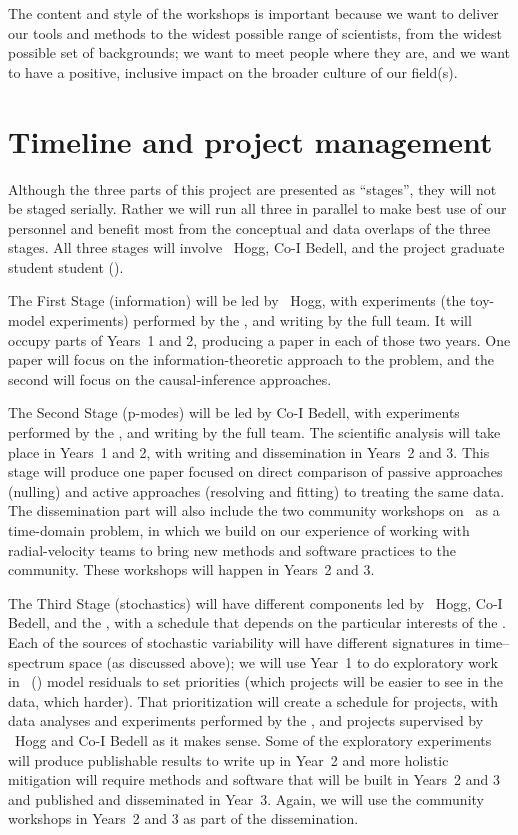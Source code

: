 \documentclass[12pt, letterpaper]{article}
\begin{document}
The content and style of the workshops is important because we want to deliver our tools and methods
to the widest possible range of scientists, from the widest possible set of
backgrounds; we want to meet people where they are, and we want
to have a positive, inclusive impact on the broader culture of our field(s).

\section{Timeline and project management}

Although the three parts of this project are presented as ``stages'',
they will not be staged serially.
Rather we will run all three in parallel to make best use of our
personnel and benefit most from the conceptual and data overlaps of the three stages.
All three stages will involve \PI\ Hogg, Co-I Bedell, and the project
graduate student student (\GRA). 

The First Stage (information) will be led by \PI\ Hogg, with experiments (the
toy-model experiments) performed by the \GRA, and writing by the full
team.
It will occupy parts of Years~1 and 2, producing a paper
in each of those two years.
One paper will focus on the information-theoretic approach to the problem,
and the second will focus on the causal-inference approaches.

The Second Stage (p-modes) will be led by Co-I Bedell, with
experiments performed by the \GRA, and writing by the full team.
The scientific analysis will take place in Years~1 and 2, with
writing and dissemination in Years~2 and 3.
This stage will produce one paper focused on direct comparison of 
passive approaches (nulling) and active approaches (resolving
and fitting) to treating the same data. 
The dissemination part will also include the two community workshops on
\EPRV\ as a time-domain problem, in which we build on our experience
of working with radial-velocity teams to bring new methods and
software practices to the community.
These workshops will happen in Years~2 and 3.

The Third Stage (stochastics) will have different components led by \PI\ Hogg,
Co-I Bedell, and the \GRA, with a schedule that depends on the
particular interests of the \GRA.
Each of the sources of stochastic variability will have different
signatures in time--spectrum space (as discussed above); we will use
Year~1 to do exploratory work in \wobble\ (\citealt{Bedell2019})
model residuals to set priorities
(which projects will be easier to see in the data, which harder).
That prioritization will create a schedule for projects, with data
analyses and experiments performed by the \GRA, and projects supervised
by \PI\ Hogg and Co-I Bedell as it makes sense.
Some of the exploratory experiments will produce publishable results
to write up in Year~2 and more holistic mitigation will require
methods and software that will be built in Years~2 and 3 and published
and disseminated in Year~3.
Again, we will use the community workshops in Years~2 and 3 as part of
the dissemination.
\end{document}
